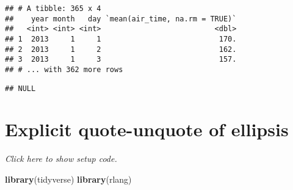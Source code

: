 \documentclass[]{book}
\newenvironment{Shaded}{\begin{snugshade}}{\end{snugshade}}
\newcommand{\CommentTok}[1]{\textcolor[rgb]{0.56,0.35,0.01}{\textit{#1}}}
\newcommand{\ControlFlowTok}[1]{\textcolor[rgb]{0.13,0.29,0.53}{\textbf{#1}}}
\newcommand{\DataTypeTok}[1]{\textcolor[rgb]{0.13,0.29,0.53}{#1}}
\newcommand{\KeywordTok}[1]{\textcolor[rgb]{0.13,0.29,0.53}{\textbf{#1}}}
\newcommand{\NormalTok}[1]{#1}
\newcommand{\OperatorTok}[1]{\textcolor[rgb]{0.81,0.36,0.00}{\textbf{#1}}}
\newcommand{\OtherTok}[1]{\textcolor[rgb]{0.56,0.35,0.01}{#1}}
\newcommand{\StringTok}[1]{\textcolor[rgb]{0.31,0.60,0.02}{#1}}
\begin{document}
\begin{Shaded}
\end{Shaded}

\begin{verbatim}
## # A tibble: 365 x 4
##    year month   day `mean(air_time, na.rm = TRUE)`
##   <int> <int> <int>                          <dbl>
## 1  2013     1     1                           170.
## 2  2013     1     2                           162.
## 3  2013     1     3                           157.
## # ... with 362 more rows
\end{verbatim}

\begin{Shaded}
\end{Shaded}

\begin{verbatim}
## NULL
\end{verbatim}

\hypertarget{explicit-quote-unquote-of-ellipsis}{%
\section{Explicit quote-unquote of ellipsis}\label{explicit-quote-unquote-of-ellipsis}}

\emph{Click here to show setup code.}

\begin{Shaded}
\begin{Highlighting}[]
\KeywordTok{library}\NormalTok{(tidyverse)}
\KeywordTok{library}\NormalTok{(rlang)}
\end{Highlighting}
\end{Shaded}

\begin{Shaded}
\end{Shaded}
\end{document}
